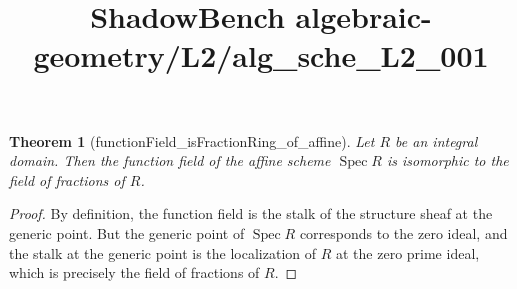 \documentclass{article}
\title{ShadowBench algebraic-geometry/L2/alg\_sche\_L2\_001}
\newtheorem{theorem}{Theorem}
\begin{document}
\maketitle

\begin{theorem}[functionField_isFractionRing_of_affine] Let $R$ be an integral domain. Then the function field of the affine scheme $\operatorname{Spec} R$ is isomorphic to the field of fractions of $R$. \end{theorem}
\begin{proof}
By definition,  the function field is the stalk of the structure sheaf at  the generic point. But the generic point of $\operatorname{Spec} R$ corresponds to the zero ideal, and the stalk at the generic point is the localization of $R$ at the zero prime ideal, which is precisely the field of fractions of $R$.
\end{proof}
\end{document}
